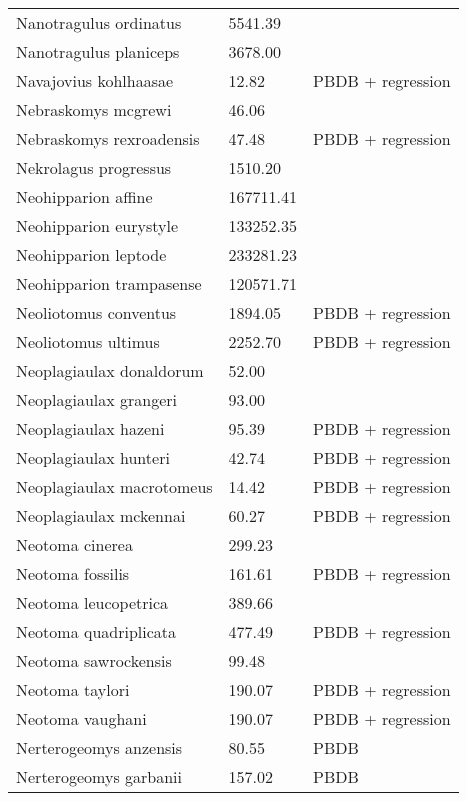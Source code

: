 \documentclass{article}
\begin{document}
\begin{center}
\begin{longtable}{p{} p{} p{}}
    Nanotragulus ordinatus & 5541.39 & \cite{Tomiya2013} \\ 
    Nanotragulus planiceps & 3678.00 & \cite{McKenna2011} \\ 
    Navajovius kohlhaasae & 12.82 & PBDB + regression \\ 
    Nebraskomys mcgrewi & 46.06 & \cite{Tomiya2013} \\ 
    Nebraskomys rexroadensis & 47.48 & PBDB + regression \\ 
    Nekrolagus progressus & 1510.20 & \cite{Tomiya2013} \\ 
    Neohipparion affine & 167711.41 & \cite{Tomiya2013} \\ 
    Neohipparion eurystyle & 133252.35 & \cite{Tomiya2013} \\ 
    Neohipparion leptode & 233281.23 & \cite{Tomiya2013} \\ 
    Neohipparion trampasense & 120571.71 & \cite{Tomiya2013} \\ 
    Neoliotomus conventus & 1894.05 & PBDB + regression \\ 
    Neoliotomus ultimus & 2252.70 & PBDB + regression \\ 
    Neoplagiaulax donaldorum & 52.00 & \cite{Wilson2012} \\ 
    Neoplagiaulax grangeri & 93.00 & \cite{Wilson2012} \\ 
    Neoplagiaulax hazeni & 95.39 & PBDB + regression \\ 
    Neoplagiaulax hunteri & 42.74 & PBDB + regression \\ 
    Neoplagiaulax macrotomeus & 14.42 & PBDB + regression \\ 
    Neoplagiaulax mckennai & 60.27 & PBDB + regression \\ 
    Neotoma cinerea & 299.23 & \cite{Smith2004} \\ 
    Neotoma fossilis & 161.61 & PBDB + regression \\ 
    Neotoma leucopetrica & 389.66 & \cite{Grohe2010} \\ 
    Neotoma quadriplicata & 477.49 & PBDB + regression \\ 
    Neotoma sawrockensis & 99.48 & \cite{Tomiya2013} \\ 
    Neotoma taylori & 190.07 & PBDB + regression \\ 
    Neotoma vaughani & 190.07 & PBDB + regression \\ 
    Nerterogeomys anzensis & 80.55 & PBDB \\ 
    Nerterogeomys garbanii & 157.02 & PBDB \\ 

\end{longtable}
\end{center}
\end{document}
